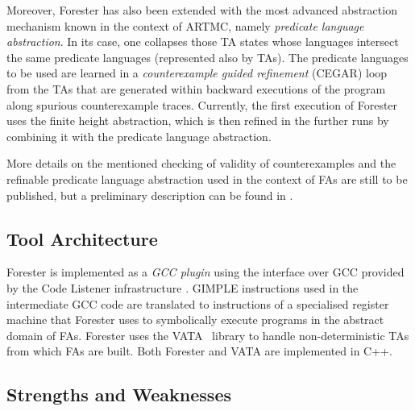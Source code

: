 Moreover, Forester has also been extended with the most advanced abstraction
mechanism known in the context of ARTMC, namely \emph{predicate language
abstraction}. In its case, one collapses those TA states whose languages
intersect the same predicate languages (represented also by TAs). The predicate
languages to be used are learned in a \emph{counterexample guided refinement}
(CEGAR) loop from the TAs that are generated within backward executions
of the program along spurious counterexample traces.
Currently, the first
execution of Forester uses the finite height abstraction, which is then refined
in the further runs by combining it with the predicate
language abstraction.

More details on the mentioned checking of validity of counterexamples and the
refinable predicate language abstraction used in the context of FAs are still to
be published, but a preliminary description can be found in \cite{mt:hruska}.


\subsection{Tool Architecture}\label{sec:architecture}

Forester is implemented as a \emph{GCC plugin} using the interface over GCC
provided by the Code Listener infrastructure \cite{codelistener}. GIMPLE
instructions used in the intermediate GCC code are translated to instructions of
a specialised register machine that Forester uses to symbolically execute
programs
in the abstract domain of FAs. Forester uses the VATA~\cite{VATA} library to
handle non-deterministic TAs from which FAs are built. Both Forester and VATA
are implemented in C++.


\subsection{Strengths and Weaknesses}\label{sec:strengths}

